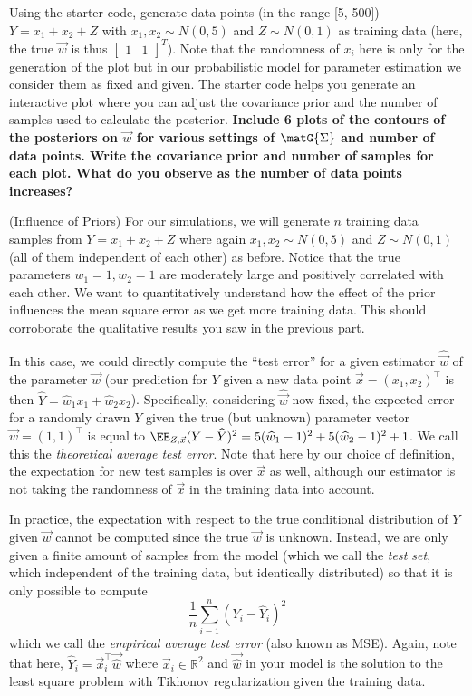 \documentclass[preview]{standalone}
\begin{document}
\begin{Parts}
Using the starter code, generate data points (in the range [5, 500])
$Y = x_1 + x_2 + Z$ with $x_1, x_2 \sim N(0, 5)$ and $Z \sim N(0, 1)$
as training data (here, the true $\vec{w}$ is thus
$\begin{bmatrix} 1 & 1 \end{bmatrix}^T$). Note that the randomness of
$x_i$ here is only for the generation of the plot but in our
probabilistic model for parameter estimation we consider them as fixed
and given. The starter code helps you generate an interactive plot
where you can adjust the covariance prior and the number of samples
used to calculate the posterior. {\bf Include 6 plots of the contours
  of the posteriors on $\vec{w}$ for various settings of
  $\matG{\Sigma}$ and number of data points. Write the covariance
  prior and number of samples for each plot. What do you observe as
  the number of data points increases? }



\Part (Influence of Priors) For our simulations, we will generate $n$
training data samples from $Y=x_1+x_2+Z$ where again
$x_1,x_2 \sim N(0,5)$ and $Z\sim N(0,1)$ (all of them independent of
each other) as before. Notice that the true parameters
$w_1 = 1, w_2 = 1$ are moderately large and positively correlated with
each other. We want to quantitatively understand how the effect of the
prior influences the mean square error as we get more training data.
This should corroborate the qualitative results you saw in the
previous part.

In this case, we could directly compute the ``test error'' for a given
estimator $\widehat{\vec{w}}$ of the parameter $\vec{w}$ (our
prediction for $Y$ given a new data point $\vec{x} = (x_1, x_2)^\top$
is then $\widehat{Y} = \widehat{w}_1 x_1 + \widehat{w}_2
x_2$). Specifically, considering $\widehat{\vec{w}}$ now fixed, the
expected error for a randomly drawn $Y$ given the true (but unknown)
parameter vector $\vec{w} = (1, 1)^\top$ is equal to
$\EE_{Z,\vec{x}}(Y-\widehat{Y})^2 = 5(\widehat{w}_1-1)^2 +
5(\widehat{w}_2 - 1)^2 + 1$. We call this the \emph{theoretical
  average test error}. Note that here by our choice of definition, the
expectation for new test samples is over $\vec{x}$ as well, although
our estimator is not taking the randomness of $\vec{x}$ in the
training data into account.

In practice, the expectation with respect to the true conditional
distribution of $Y$ given $\vec{w}$ cannot be computed since the true
$\vec{w}$ is unknown. Instead, we are only given a finite amount of
samples from the model (which we call the \emph{test set}, which independent
of the training data, but identically distributed) so that
it is only possible to compute
\begin{equation*}
\frac{1}{n}\sum_{i=1}^n(Y_i-\hat{Y}_i)^2
\end{equation*}
which we call the \emph{empirical average test error} (also known as MSE).
Again, note that here,
$\hat{Y}_i = \vec{x}_i^\top\vec{\widehat{w}}$ where
$\vec{x}_i\in\mathbb{R}^2$ and $\vec{\widehat{w}}$ in your model is
the solution to the least square problem with Tikhonov regularization
given the training data.


\end{Parts}
\end{document}
